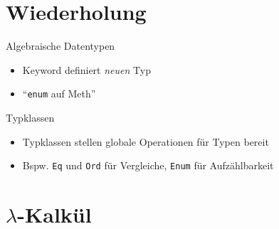 \documentclass{beamer}
\newcommand{\code}[1]{
	\begin{mdframed}
		
	\end{mdframed}
}
\begin{document}
\section{Wiederholung}

\begin{frame}{Algebraische Datentypen}
	\code{demos/DataExamples.hs}

	\begin{itemize}
		\item Keyword  definiert \emph{neuen} Typ
		\item \enquote{\texttt{enum} auf Meth}
	\end{itemize}
\end{frame}

\begin{frame}{Typklassen}
	\code{demos/TypeClassExamples.hs}

	\begin{itemize}
		\item Typklassen stellen globale Operationen für Typen bereit
		\item Bspw. \texttt{Eq} und \texttt{Ord} für Vergleiche, \texttt{Enum} für Aufzählbarkeit
	\end{itemize}
\end{frame}

\section{$\lambda$-Kalkül}
\end{document}
